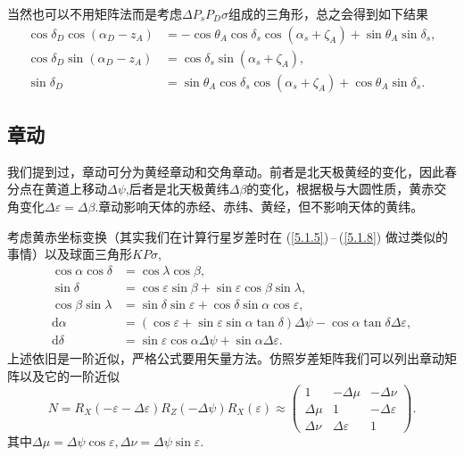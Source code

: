 \documentclass[11pt, a4paper, oneside]{ctexart}
\numberwithin{equation}{subsection}
\begin{document}
当然也可以不用矩阵法而是考虑$\Delta{}P_{s}P_{D}\sigma$组成的三角形，总之会得到如下结果
\begin{align}
\cos\delta_D\cos\left(\alpha_D-z_A\right)&=-\cos\theta_A\cos\delta_s\cos\left(\alpha_s+\zeta_A\right)+\sin\theta_A\sin\delta_s,\\
\cos\delta_D\sin\left(\alpha_D-z_A\right)&=\cos\delta_s\sin\left(\alpha_s+\zeta_A\right),\\
\sin\delta_D&=\sin\theta_A\cos\delta_s\cos\left(\alpha_s+\zeta_A\right)+\cos\theta_A\sin\delta_s.
\end{align}

\subsection{章动}
我们提到过，章动可分为黄经章动和交角章动。前者是北天极黄经的变化，因此春分点在黄道上移动$\Delta{}\psi$,后者是北天极黄纬$\Delta{}\beta$的变化，根据极与大圆性质，黄赤交角变化$\Delta{}\varepsilon=\Delta{}\beta$.章动影响天体的赤经、赤纬、黄经，但不影响天体的黄纬。

考虑黄赤坐标变换（其实我们在计算行星岁差时在 (\ref{5.1.5})\,--\,(\ref{5.1.8}) 做过类似的事情）以及球面三角形$KP\sigma$,
\begin{align}
\cos\alpha\cos\delta&=\cos\lambda\cos\beta,\\
\sin\delta&=\cos\varepsilon\sin\beta+\sin\varepsilon\cos\beta\sin\lambda,\\
\cos\beta\sin\lambda&=\sin\delta\sin\varepsilon+\cos\delta\sin\alpha\cos\varepsilon,\\
\mathrm{d}\alpha&=\left(\cos\varepsilon+\sin\varepsilon\sin\alpha\tan\delta\right)\Delta\psi-\cos\alpha\tan\delta\Delta\varepsilon,\\
\mathrm{d}\delta&=\sin\varepsilon\cos\alpha\Delta\psi+\sin\alpha\Delta\varepsilon.
\end{align}
上述依旧是一阶近似，严格公式要用矢量方法。仿照岁差矩阵我们可以列出章动矩阵以及它的一阶近似
\begin{equation}
N=R_X\left(-\varepsilon-\Delta\varepsilon\right)R_Z\left(-\Delta\psi\right)R_X\left(\varepsilon\right)\approx\begin{pmatrix}
1 & -\Delta{}\mu & -\Delta{}\nu\\
\Delta{}\mu & 1 & -\Delta{}\varepsilon\\
\Delta{}\nu & \Delta{}\varepsilon & 1
\end{pmatrix}.
\end{equation}
其中$\Delta{}\mu=\Delta{}\psi\cos\varepsilon,\Delta{}\nu=\Delta{}\psi\sin\varepsilon$.
\end{document}
